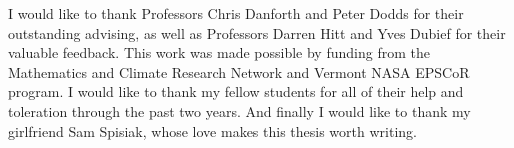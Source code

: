 \begin{acknowledgements}
I would like to thank Professors Chris Danforth and Peter Dodds for their outstanding advising, as well as Professors Darren Hitt and Yves Dubief for their valuable feedback.
This work was made possible by funding from the Mathematics and Climate Research Network and Vermont NASA EPSCoR program.
I would like to thank my fellow students for all of their help and toleration through the past two years.
And finally I would like to thank my girlfriend Sam Spisiak, whose love makes this thesis worth writing.
\end{acknowledgements}
